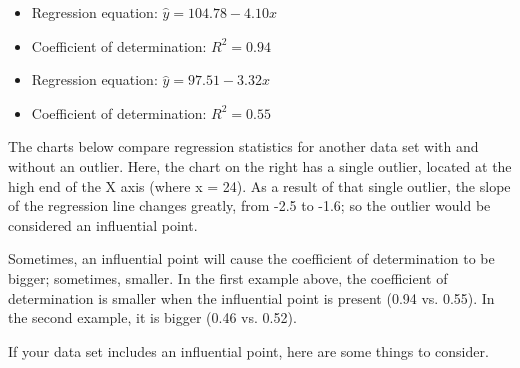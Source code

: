 \documentclass[residuals.tex]{subfiles}
\begin{document}

\begin{itemize}
\item Regression equation: $\hat{y} = 104.78 - 4.10x$
\item Coefficient of determination: $R^2 = 0.94$ 
\end{itemize}
\begin{itemize}
\item Regression equation: $\hat{y} = 97.51 - 3.32x$
\item Coefficient of determination: $R^2 = 0.55$ 
\end{itemize}

The charts below compare regression statistics for another data set with and without an outlier. Here, the chart on the right has a single outlier, located at the high end of the X axis (where x = 24). As a result of that single outlier, the slope of the regression line changes greatly, from -2.5 to -1.6; so the outlier would be considered an influential point.





Sometimes, an influential point will cause the coefficient of determination to be bigger; sometimes, smaller. In the first example above, the coefficient of determination is smaller when the influential point is present (0.94 vs. 0.55). In the second example, it is bigger (0.46 vs. 0.52).

If your data set includes an influential point, here are some things to consider.

\end{document}
